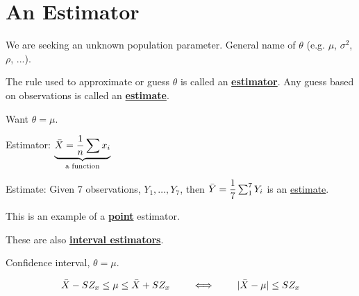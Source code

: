 \section{An Estimator}
We are seeking an unknown population parameter. General name of $\theta$ (e.g. $\mu$, $\sigma^2$, $\rho$, ...).

\nl The rule used to approximate or guess $\theta$ is called an \textbf{\underline{estimator}}. Any guess based on observations is called an \textbf{\underline{estimate}}.

\example Want $\theta = \mu$.

\vspace{0.2in}
Estimator: $\underbrace{\Xbar = \over{n} \sum x_i}_{\text{a function}}$

\vspace{0.15in}
Estimate: Given 7 observations, $Y_1, \dots, Y_7$, then
$\Ybar = \over*{7} \sum_1^7 Y_i$ is an \underline{estimate}.

\vspace{0.2in}
\nl This is an example of a \textbf{\underline{point}} estimator.

\nnl These are also \textbf{\underline{interval estimators}}.

\example Confidence interval, $\theta = \mu$.

$$\bar{X} - SZ_x \leq \mu \leq \bar{X} + SZ_x \qquad\iff\qquad |\bar{X} - \mu | \leq SZ_x$$